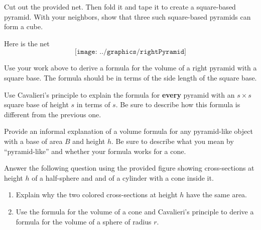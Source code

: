 %
%
%

\begin{prob}
Cut out the provided net.  Then fold it and tape it to create a square-based pyramid.  With your neighbors, show that three such square-based pyramids can form a cube.  
\end{prob}
\begin{teachingnote}
Here is the net
$$\texttt{[image: ../graphics/rightPyramid]}$$
\end{teachingnote}

\begin{prob}
Use your work above to derive a formula for the volume of a
right pyramid with a square base. The formula should be in terms of
the side length of the square base.
\end{prob}

\begin{prob}
Use Cavalieri's principle to explain the formula for \textbf{every} pyramid with an $s\times s$ square base of height $s$ in terms of $s$.  Be sure to describe how this formula is different from the previous one.  
\end{prob}

\begin{prob}
Provide an informal explanation of a volume formula for any pyramid-like object with a base of area $B$ and height $h$.  Be sure to describe what you mean by ``pyramid-like'' and whether your formula works for a cone.  
\end{prob}

\begin{prob}
Answer the following question using the provided figure showing cross-sections at height $h$ of a half-sphere and and of a cylinder with a cone inside it.  
\begin{enumerate}
\item Explain why the two colored cross-sections at height $h$ have the same area. 
\item Use the formula for the volume of a cone and Cavalieri's principle to derive a formula for the volume of a sphere of radius $r$.  
\end{enumerate}
\end{prob}

